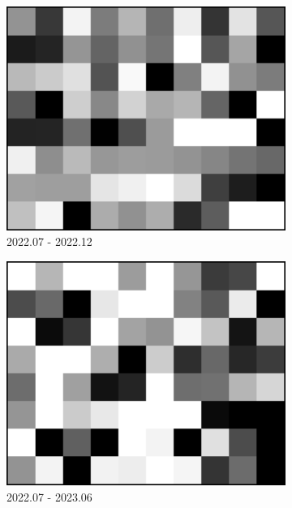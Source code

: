 \documentclass[preprint, authoryear]{elsarticle}
\begin{document}
\begin{figure}
\begin{subfigure}{0.3\textwidth}
        \centering
        \includegraphics[width=\textwidth]{figure/The azimuth shift/shift_TaklimakanDesert_des_20221227.png}
        \caption{2022.07 - 2022.12}
        \label{fig_7g}
    \end{subfigure}
    \begin{subfigure}{0.3\textwidth}
        \centering
        \includegraphics[width=\textwidth]{figure/The azimuth shift/shift_TaklimakanDesert_des_20230625.png}
        \caption{2022.07 - 2023.06}
        \label{fig_7k}
    \end{subfigure}
    \begin{subfigure}{0.3\textwidth}

\end{subfigure}
\end{figure}
\end{document}
